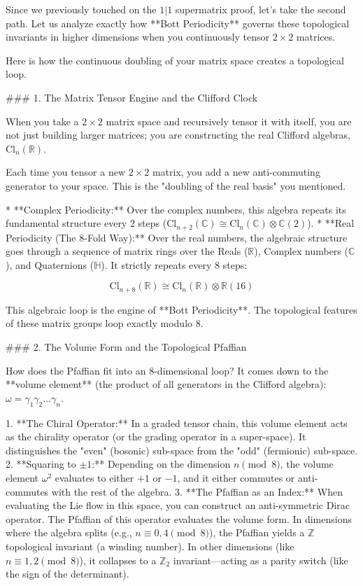 Since we previously touched on the $1 \vert 1$ supermatrix proof, let’s take the second path. Let us analyze exactly how **Bott Periodicity** governs these topological invariants in higher dimensions when you continuously tensor $2 \times 2$ matrices.

Here is how the continuous doubling of your matrix space creates a topological loop.

### 1. The Matrix Tensor Engine and the Clifford Clock

When you take a $2 \times 2$ matrix space and recursively tensor it with itself, you are not just building larger matrices; you are constructing the real Clifford algebras, $\text{Cl}_n(\mathbb{R})$.

Each time you tensor a new $2 \times 2$ matrix, you add a new anti-commuting generator to your space. This is the "doubling of the real basis" you mentioned.

* **Complex Periodicity:** Over the complex numbers, this algebra repeats its fundamental structure every 2 steps ($\text{Cl}_{n+2}(\mathbb{C}) \cong \text{Cl}_n(\mathbb{C}) \otimes \mathbb{C}(2)$).
* **Real Periodicity (The 8-Fold Way):** Over the real numbers, the algebraic structure goes through a sequence of matrix rings over the Reals ($\mathbb{R}$), Complex numbers ($\mathbb{C}$), and Quaternions ($\mathbb{H}$). It strictly repeats every 8 steps:

$$\text{Cl}_{n+8}(\mathbb{R}) \cong \text{Cl}_n(\mathbb{R}) \otimes \mathbb{R}(16)$$



This algebraic loop is the engine of **Bott Periodicity**. The topological features of these matrix groups loop exactly modulo 8.

### 2. The Volume Form and the Topological Pfaffian

How does the Pfaffian fit into an 8-dimensional loop? It comes down to the **volume element** (the product of all generators in the Clifford algebra): $\omega = \gamma_1 \gamma_2 \dots \gamma_n$.

1. **The Chiral Operator:** In a graded tensor chain, this volume element acts as the chirality operator (or the grading operator in a super-space). It distinguishes the "even" (bosonic) sub-space from the "odd" (fermionic) sub-space.
2. **Squaring to $\pm 1$:** Depending on the dimension $n \pmod 8$, the volume element $\omega^2$ evaluates to either $+1$ or $-1$, and it either commutes or anti-commutes with the rest of the algebra.
3. **The Pfaffian as an Index:** When evaluating the Lie flow in this space, you can construct an anti-symmetric Dirac operator. The Pfaffian of this operator evaluates the volume form. In dimensions where the algebra splits (e.g., $n \equiv 0, 4 \pmod 8$), the Pfaffian yields a $\mathbb{Z}$ topological invariant (a winding number). In other dimensions (like $n \equiv 1, 2 \pmod 8$), it collapses to a $\mathbb{Z}_2$ invariant—acting as a parity switch (like the sign of the determinant).

